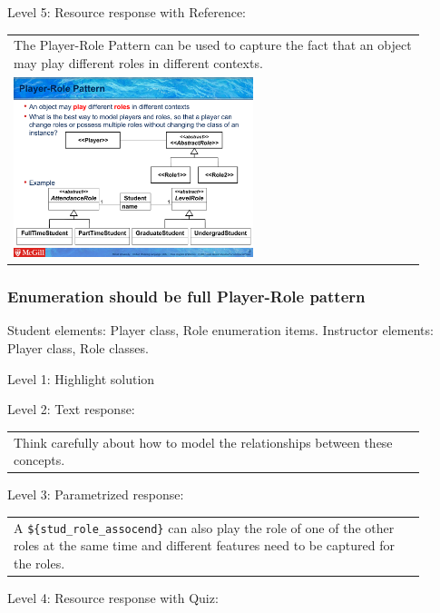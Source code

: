 \noindent Level 5: Resource response with Reference: \medskip

\begin{tabular}{|p{0.9\linewidth}}
The Player-Role Pattern can be used to capture the fact that an object may play different roles
in different contexts.

\\
\includegraphics[width=0.6\textwidth]{images/player_role.png}
\end{tabular} \medskip


\subsubsection{Enumeration should be full Player-Role pattern}

Student elements: Player class, Role enumeration items. Instructor elements: Player class, Role classes. \medskip

\noindent Level 1: Highlight solution  \medskip

\noindent Level 2: Text response: \medskip

\begin{tabular}{|p{0.9\linewidth}}
Think carefully about how to model the relationships between these concepts.
\end{tabular} \medskip

\noindent Level 3: Parametrized response: \medskip

\begin{tabular}{|p{0.9\linewidth}}
A \verb|${stud_role_assocend}| can also play the role of one of the other roles at the same time and different features need to be captured for the roles.
\end{tabular} \medskip

\noindent Level 4: Resource response with Quiz: \medskip



